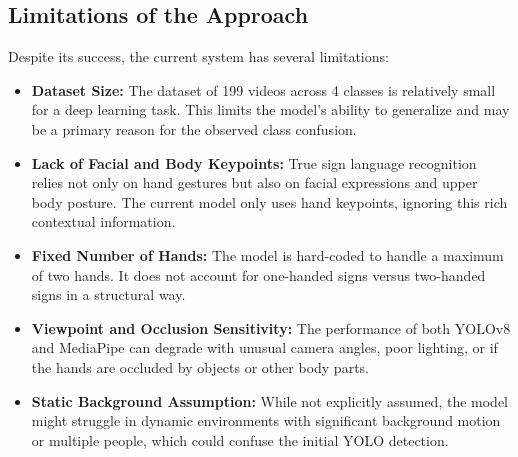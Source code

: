 \documentclass[11pt, a4paper]{article}
\begin{document}
\subsection{Limitations of the Approach}
Despite its success, the current system has several limitations:
\begin{itemize}
    \item \textbf{Dataset Size:} The dataset of 199 videos across 4 classes is relatively small for a deep learning task. This limits the model's ability to generalize and may be a primary reason for the observed class confusion.
    \item \textbf{Lack of Facial and Body Keypoints:} True sign language recognition relies not only on hand gestures but also on facial expressions and upper body posture. The current model only uses hand keypoints, ignoring this rich contextual information.
    \item \textbf{Fixed Number of Hands:} The model is hard-coded to handle a maximum of two hands. It does not account for one-handed signs versus two-handed signs in a structural way.
    \item \textbf{Viewpoint and Occlusion Sensitivity:} The performance of both YOLOv8 and MediaPipe can degrade with unusual camera angles, poor lighting, or if the hands are occluded by objects or other body parts.
    \item \textbf{Static Background Assumption:} While not explicitly assumed, the model might struggle in dynamic environments with significant background motion or multiple people, which could confuse the initial YOLO detection.
\end{itemize}
\end{document}
